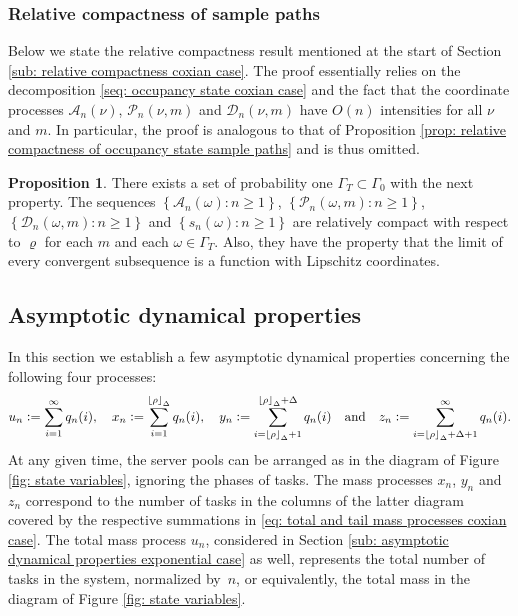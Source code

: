 \documentclass[a4paper, 12pt]{article}
\theoremstyle{definition}
\newtheorem{proposition}[theorem]{Proposition}
\newcommand{\floor}[1]{\left\lfloor#1\right\rfloor}
\newcommand{\set}[2]{\left\{#1 : #2\right\}}
\newcommand{\defeq}{\vcentcolon=}
\newcommand{\calA}{\mathcal{A}}
\newcommand{\calD}{\mathcal{D}}
\newcommand{\calP}{\mathcal{P}}
\begin{document}
\subsubsection{Relative compactness of sample paths}
\label{subsub: relative compactness of sample paths coxian case}

Below we state the relative compactness result mentioned at the start of Section \ref{sub: relative compactness coxian case}. The proof essentially relies on the decomposition \eqref{seq: occupancy state coxian case} and the fact that the coordinate processes $\calA_n(\nu)$, $\calP_n(\nu, m)$ and $\calD_n(\nu, m)$ have $O(n)$ intensities for all $\nu$ and $m$. In particular, the proof is analogous to that of Proposition \ref{prop: relative compactness of occupancy state sample paths} and is thus omitted.

\begin{proposition}
	\label{prop: relative compactness of occupancy state sample paths coxian case}
	There exists a set of probability one $\Gamma_T \subset \Gamma_0$ with the next property. The sequences $\set{\calA_n(\omega)}{n \geq 1}$, $\set{\calP_n(\omega, m)}{n \geq 1}$, $\set{\calD_n(\omega, m)}{n \geq 1}$ and $\set{s_n(\omega)}{n \geq 1}$ are relatively compact with respect to $\varrho$ for each $m$ and each $\omega \in \Gamma_T$. Also, they have the property that the limit of every convergent subsequence is a function with Lipschitz coordinates. 
\end{proposition}

\subsection{Asymptotic dynamical properties}
\label{sub: asymptotic dynamical properties coxian case}

In this section we establish a few asymptotic dynamical properties concerning the following four processes:
\begin{equation}
	\label{eq: total and tail mass processes coxian case}
	u_n \defeq \sum_{i = 1}^\infty q_n(i), \quad x_n \defeq \sum_{i = 1}^{\floor{\rho}_\Delta} q_n(i), \quad y_n \defeq \sum_{i = \floor{\rho}_\Delta + 1}^{\floor{\rho}_\Delta + \Delta} q_n(i) \quad \text{and} \quad z_n \defeq \sum_{i = \floor{\rho}_\Delta + \Delta + 1}^\infty q_n(i).
\end{equation}
At any given time, the server pools can be arranged as in the diagram of Figure \ref{fig: state variables}, ignoring the phases of tasks. The mass processes $x_n$, $y_n$ and $z_n$ correspond to the number of tasks in the columns of the latter diagram covered by the respective summations in \eqref{eq: total and tail mass processes coxian case}. The total mass process $u_n$, considered in Section \ref{sub: asymptotic dynamical properties exponential case} as well, represents the total number of tasks in the system, normalized by~$n$, or equivalently, the total mass in the diagram of Figure \ref{fig: state variables}.
\end{document}
